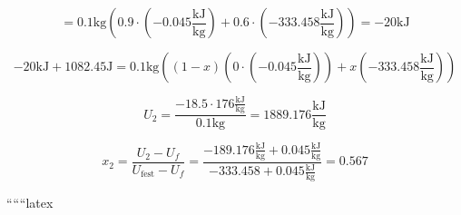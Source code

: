 \[
= 0.1 \text{kg} \left( 0.9 \cdot (-0.045 \frac{\text{kJ}}{\text{kg}}) + 0.6 \cdot (-333.458 \frac{\text{kJ}}{\text{kg}}) \right) = -20 \text{kJ}
\]

\[
-20 \text{kJ} + 1082.45 \text{J} = 0.1 \text{kg} \left( (1-x) \left( 0 \cdot (-0.045 \frac{\text{kJ}}{\text{kg}}) \right) + x \left( -333.458 \frac{\text{kJ}}{\text{kg}} \right) \right)
\]

\[
U_2 = \frac{-18.5 \cdot 176 \frac{\text{kJ}}{\text{kg}}}{0.1 \text{kg}} = 1889.176 \frac{\text{kJ}}{\text{kg}}
\]

\[
x_2 = \frac{U_2 - U_f}{U_{\text{fest}} - U_f} = \frac{-189.176 \frac{\text{kJ}}{\text{kg}} + 0.045 \frac{\text{kJ}}{\text{kg}}}{-333.458 + 0.045 \frac{\text{kJ}}{\text{kg}}} = 0.567
\]

``````latex


